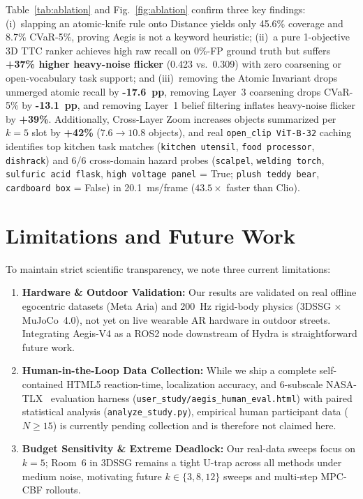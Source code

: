 \documentclass[journal]{IEEEtran}
\begin{document}
Table~\ref{tab:ablation} and Fig.~\ref{fig:ablation} confirm three key findings: (i)~slapping an atomic-knife rule onto Distance yields only 45.6\% coverage and 8.7\% CVaR-5\%, proving Aegis is not a keyword heuristic; (ii)~a pure 1-objective 3D TTC ranker achieves high raw recall on 0\%-FP ground truth but suffers \textbf{+37\% higher heavy-noise flicker} (0.423 vs.\ 0.309) with zero coarsening or open-vocabulary task support; and (iii)~removing the Atomic Invariant drops unmerged atomic recall by \textbf{-17.6~pp}, removing Layer~3 coarsening drops CVaR-5\% by \textbf{-13.1~pp}, and removing Layer~1 belief filtering inflates heavy-noise flicker by \textbf{+39\%}. Additionally, Cross-Layer Zoom increases objects summarized per $k=5$ slot by \textbf{+42\%} ($7.6 \to 10.8$ objects), and real \texttt{open\_clip ViT-B-32} caching identifies top kitchen task matches (\texttt{kitchen utensil}, \texttt{food processor}, \texttt{dishrack}) and 6/6 cross-domain hazard probes (\texttt{scalpel}, \texttt{welding torch}, \texttt{sulfuric acid flask}, \texttt{high voltage panel} = True; \texttt{plush teddy bear}, \texttt{cardboard box} = False) in 20.1~ms/frame ($43.5\times$ faster than Clio).

\section{Limitations and Future Work}
To maintain strict scientific transparency, we note three current limitations:
\begin{enumerate}
    \item \textbf{Hardware \& Outdoor Validation:} Our results are validated on real offline egocentric datasets (Meta Aria) and 200~Hz rigid-body physics (3DSSG $\times$ MuJoCo~4.0), not yet on live wearable AR hardware in outdoor streets. Integrating Aegis-V4 as a ROS2 node downstream of Hydra is straightforward future work.
    \item \textbf{Human-in-the-Loop Data Collection:} While we ship a complete self-contained HTML5 reaction-time, localization accuracy, and 6-subscale NASA-TLX~\cite{hart1988nasatlx} evaluation harness (\texttt{user\_study/aegis\_human\_eval.html}) with paired statistical analysis (\texttt{analyze\_study.py}), empirical human participant data ($N \ge 15$) is currently pending collection and is therefore not claimed here.
    \item \textbf{Budget Sensitivity \& Extreme Deadlock:} Our real-data sweeps focus on $k = 5$; Room~6 in 3DSSG remains a tight U-trap across all methods under medium noise, motivating future $k \in \{3, 8, 12\}$ sweeps and multi-step MPC-CBF rollouts.
\end{enumerate}
\end{document}
